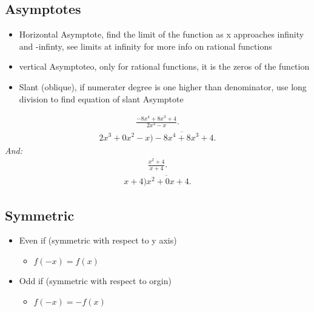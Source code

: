 \documentclass{report}
\begin{document}
    \subsection{Asymptotes}
    \begin{itemize}
      \item Horizontal Asymptote, find the limit of the function as x approaches infinity and -infinty, see limits at infinity for more info on rational functions
      \item vertical Asymptoteo, only for rational functions, it is the zeros of the function
      \item Slant (oblique), if numerater degree is one higher than denominator, use long division to find equation of slant Asymptote
    \end{itemize}
    \begin{align*}
      \frac{-8x^{4}+8x^{3}+4}{2x^{3}-x}
    .\end{align*}
    \begin{align*}
      2x^{3}+0x^{2}-x \overline{)-8x^{4}+8x^{3}+4}
    .\end{align*}
    \bigbreak \noindent 
    \textit{And:}
    \begin{align*}
      \frac{x^{2}+4}{x+4}
    .\end{align*}
    \begin{align*}
      x+4 \overline{)x^{2}+0x+4}
    .\end{align*}


    \bigbreak \noindent \bigbreak \noindent 
    \subsection{Symmetric}
    \begin{itemize}
      \item Even if (symmetric with respect to y axis)
        \begin{itemize}
          \item $f(-x) = f(x) $
        \end{itemize}
      \item Odd if (symmetric with respect to orgin)
        \begin{itemize}
          \item $f(-x) = -f(x)$
        \end{itemize}
    \end{itemize}

    \bigbreak \noindent \bigbreak \noindent 
\end{document}
